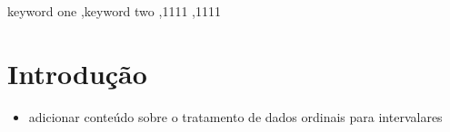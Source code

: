 \documentclass[preprint,12pt]{elsarticle}
\begin{document}
\begin{frontmatter}
\begin{abstract}
\end{abstract}



\begin{keyword}
keyword one \sep keyword two
 \sep 1111
 \sep 1111
\end{keyword}

\end{frontmatter}


\section{Introdução}
\label{sec:introducao}

\begin{itemize}
\color{blue}
\item adicionar conteúdo sobre o tratamento de dados ordinais para intervalares

\end{itemize}
\end{document}
